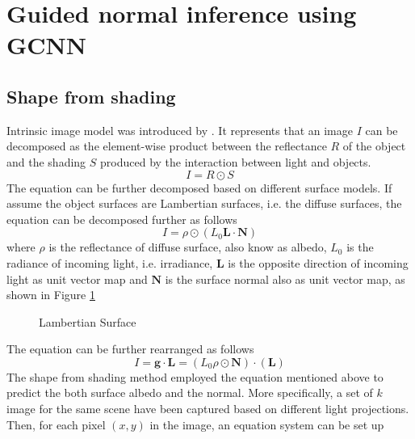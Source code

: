 \documentclass[]{article}
\begin{document}
	
\section{Guided normal inference using GCNN}

\subsection{Shape from shading}
Intrinsic image model was introduced by \cite{intrinsic-image}. It represents that an image $ I $ can be decomposed as the element-wise product between the reflectance $ R $ of the object and the shading $ S $ produced by the interaction between light and objects.
\[ I =R  \odot S\]
The equation can be further decomposed based on different surface models. If assume the object surfaces are Lambertian surfaces, i.e. the diffuse surfaces, the equation can be decomposed further as follows
\[ I = \rho  \odot (L_0 \textbf{L} \cdot  \textbf{N}) \]
where $ \rho $ is the reflectance of diffuse surface, also know as albedo, $ L_0 $ is the radiance of  incoming light, i.e. irradiance, $ \textbf{L} $ is the opposite direction of incoming light as unit vector map and $ \textbf{N} $ is the surface normal also as unit vector map, as shown in Figure \ref{fig:lambertian-surface}

\begin{figure}[th]
	\centering
	\caption{Lambertian Surface}
	\label{fig:lambertian-surface}
\end{figure}

The equation can be further rearranged as follows
\[ I = \textbf{g} \cdot \textbf{L} =(L_0\rho \odot \textbf{N}) \cdot  ( \textbf{L}) \]
The shape from shading method employed the equation mentioned above to predict the both surface albedo and the normal. More specifically, a set of $ k $ image for the same scene have been captured based on different light projections. Then, for each pixel $ (x,y) $ in the image, an equation system can be set up 
\end{document}
